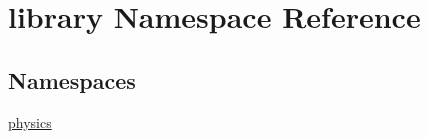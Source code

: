 \hypertarget{namespacelibrary}{}\section{library Namespace Reference}
\label{namespacelibrary}
\subsection*{Namespaces}
\begin{DoxyCompactItemize}
\item 
 \hyperlink{namespacelibrary_1_1physics}{physics}
\end{DoxyCompactItemize}
